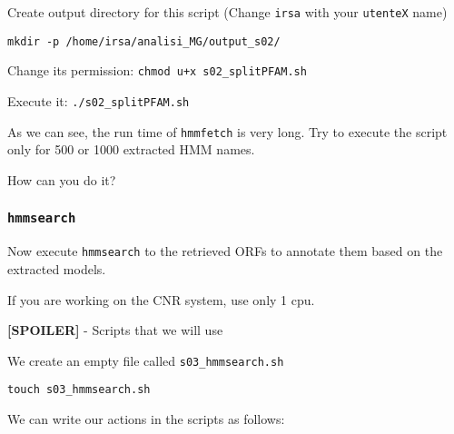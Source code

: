 \documentclass[
]{book}
\newenvironment{Shaded}{\begin{snugshade}}{\end{snugshade}}
\newcommand{\AttributeTok}[1]{\textcolor[rgb]{0.13,0.29,0.53}{#1}}
\newcommand{\BuiltInTok}[1]{#1}
\newcommand{\CommentTok}[1]{\textcolor[rgb]{0.56,0.35,0.01}{\textit{#1}}}
\newcommand{\ControlFlowTok}[1]{\textcolor[rgb]{0.13,0.29,0.53}{\textbf{#1}}}
\newcommand{\ExtensionTok}[1]{#1}
\newcommand{\FunctionTok}[1]{\textcolor[rgb]{0.13,0.29,0.53}{\textbf{#1}}}
\newcommand{\KeywordTok}[1]{\textcolor[rgb]{0.13,0.29,0.53}{\textbf{#1}}}
\newcommand{\NormalTok}[1]{#1}
\newcommand{\OperatorTok}[1]{\textcolor[rgb]{0.81,0.36,0.00}{\textbf{#1}}}
\newcommand{\StringTok}[1]{\textcolor[rgb]{0.31,0.60,0.02}{#1}}
\newcommand{\VariableTok}[1]{\textcolor[rgb]{0.00,0.00,0.00}{#1}}
\begin{document}
Create output directory for this script (Change \texttt{irsa} with your \texttt{utenteX} name)

\begin{verbatim}
mkdir -p /home/irsa/analisi_MG/output_s02/
\end{verbatim}

Change its permission:
\texttt{chmod\ u+x\ s02\_splitPFAM.sh}

Execute it:
\texttt{./s02\_splitPFAM.sh}

As we can see, the run time of \texttt{hmmfetch} is very long. Try to execute the script only for 500 or 1000 extracted HMM names.

How can you do it?

\subsubsection{\texorpdfstring{\texttt{hmmsearch}}{hmmsearch}}\label{hmmsearch}

Now execute \texttt{hmmsearch} to the retrieved ORFs to annotate them based on the extracted models.

If you are working on the CNR system, use only 1 cpu.

\textbf{{[}SPOILER{]}} - Scripts that we will use

We create an empty file called \texttt{s03\_hmmsearch.sh}

\texttt{touch\ s03\_hmmsearch.sh}

We can write our actions in the scripts as follows:

\begin{Shaded}
\end{Shaded}
\end{document}
